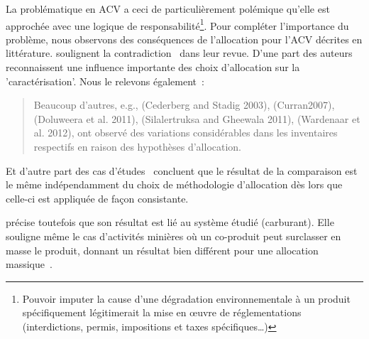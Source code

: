 
La problématique en ACV a ceci de particulièrement polémique qu'elle est approchée avec une logique de responsabilité\footnote{Pouvoir imputer la cause d'une dégradation environnementale à un produit spécifiquement légitimerait la mise en œuvre de réglementations (interdictions, permis, impositions et taxes spécifiques\ldots)}.
Pour compléter l'importance du problème, nous observons des conséquences de l'allocation pour l'ACV décrites en littérature.
\citeauthor{cherubini_influence_2011} soulignent la contradiction~\cite{cherubini_influence_2011} dans leur revue.
D'une part des auteurs reconnaissent une influence importante des choix d'allocation sur la 'caractérisation'.
Nous le relevons également~:
\blockcquote[traduction]{cruze_allocation_2014}{
Beaucoup d'autres, e.g., (Cederberg and Stadig 2003), (Curran2007)\cite{curran_studying_2007}, (Doluweera et al. 2011), (Silalertruksa and
Gheewala 2011), (Wardenaar et al. 2012)\cite{wardenaar_differences_2012}, ont observé des variations considérables dans les inventaires respectifs en raison des hypothèses d'allocation.
}
Et d'autre part des cas d'études~\cite{curran_studying_2007,guinee_calculating_2007} concluent que le résultat de la comparaison est le même indépendamment du choix de méthodologie d'allocation dès lors que celle-ci est appliquée de façon consistante.

\citeauthor{curran_studying_2007} précise toutefois que son résultat est lié au système étudié (carburant).
Elle souligne même le cas d'activités minières où un co-produit peut surclasser en masse le produit, donnant un résultat bien différent pour une allocation massique~\cite{curran_studying_2007}.

